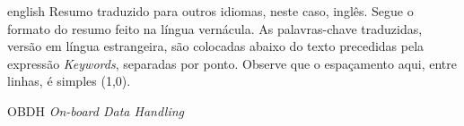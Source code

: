 \documentclass[
12pt,				%
oneside,			%
a4paper,			%
chapter=TITLE,		%
section=TITLE,		%
english,			%
brazil				%
hyperref=hidelinks]{abntex2}
\begin{document}
\begin{resumo}[Abstract]
    \begin{otherlanguage*}{english}
        Resumo traduzido para outros idiomas, neste caso, inglês. Segue o formato do resumo feito na língua vernácula. As palavras-chave traduzidas, versão em língua estrangeira, são colocadas abaixo do texto precedidas pela expressão \emph{Keywords}, separadas por ponto. Observe que o espaçamento aqui, entre linhas, é simples (1,0).
    \end{otherlanguage*}

\end{resumo}
\imprimirlistafiguras


\imprimirlistatabelas

\begin{siglas}
	\item[OBDH] \textit{On-board Data Handling} 
\end{siglas}


\imprimirsumario


\textual







\postextual
%
%
\end{document}
